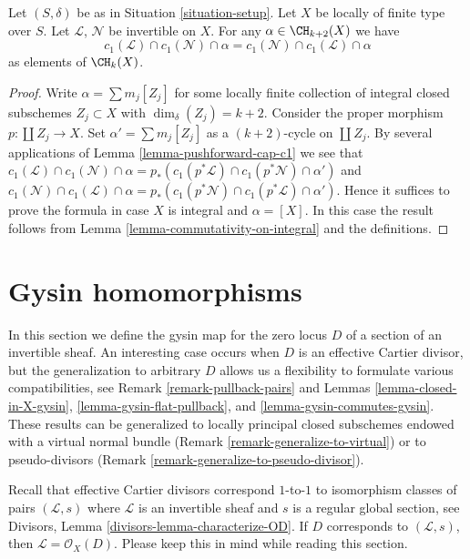 \begin{lemma}
\label{lemma-cap-commutative}
Let $(S, \delta)$ be as in Situation \ref{situation-setup}.
Let $X$ be locally of finite type over $S$.
Let $\mathcal{L}$, $\mathcal{N}$ be invertible on $X$.
For any $\alpha \in \CH_{k + 2}(X)$ we have
$$
c_1(\mathcal{L}) \cap c_1(\mathcal{N}) \cap \alpha
=
c_1(\mathcal{N}) \cap c_1(\mathcal{L}) \cap \alpha
$$
as elements of $\CH_k(X)$.
\end{lemma}

\begin{proof}
Write $\alpha = \sum m_j[Z_j]$ for some locally finite
collection of integral closed subschemes $Z_j \subset X$
with $\dim_\delta(Z_j) = k + 2$.
Consider the proper morphism $p : \coprod Z_j \to X$.
Set $\alpha' = \sum m_j[Z_j]$ as a $(k + 2)$-cycle on
$\coprod Z_j$. By several applications of
Lemma \ref{lemma-pushforward-cap-c1} we see that
$c_1(\mathcal{L}) \cap c_1(\mathcal{N}) \cap \alpha
= p_*(c_1(p^*\mathcal{L}) \cap c_1(p^*\mathcal{N}) \cap \alpha')$
and
$c_1(\mathcal{N}) \cap c_1(\mathcal{L}) \cap \alpha
= p_*(c_1(p^*\mathcal{N}) \cap c_1(p^*\mathcal{L}) \cap \alpha')$.
Hence it suffices to prove the formula in case $X$ is integral
and $\alpha = [X]$. In this case the result follows
from Lemma \ref{lemma-commutativity-on-integral} and the definitions.
\end{proof}






\section{Gysin homomorphisms}
\label{section-intersecting-effective-Cartier}

\noindent
In this section we define the gysin map for the zero locus $D$ of a
section of an invertible sheaf. An interesting case occurs when $D$
is an effective Cartier divisor, but the generalization to arbitrary $D$
allows us a flexibility to formulate various compatibilities, see
Remark \ref{remark-pullback-pairs} and
Lemmas \ref{lemma-closed-in-X-gysin}, \ref{lemma-gysin-flat-pullback}, and
\ref{lemma-gysin-commutes-gysin}.
These results can be generalized to locally principal closed subschemes
endowed with a virtual normal bundle
(Remark \ref{remark-generalize-to-virtual}) or to
pseudo-divisors (Remark \ref{remark-generalize-to-pseudo-divisor}).

\medskip\noindent
Recall that effective Cartier divisors correspond $1$-to-$1$ to
isomorphism classes of pairs $(\mathcal{L}, s)$ where $\mathcal{L}$
is an invertible sheaf and $s$ is a regular global section, see
Divisors, Lemma \ref{divisors-lemma-characterize-OD}.
If $D$ corresponds to $(\mathcal{L}, s)$, then
$\mathcal{L} = \mathcal{O}_X(D)$. Please keep this in mind while
reading this section.

